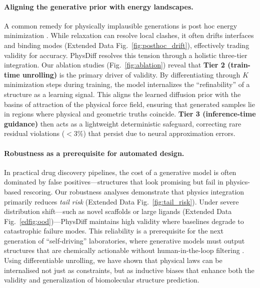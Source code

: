 \documentclass[twocolumn,10pt]{article}
\newcommand{\modelname}{PhysDiff}
\begin{document}
\paragraph{Aligning the generative prior with energy landscapes.}
A common remedy for physically implausible generations is post hoc energy minimization \cite{case2005amber}. While relaxation can resolve local clashes, it often drifts interfaces and binding modes (Extended Data Fig.~\ref{fig:posthoc_drift}), effectively trading validity for accuracy.
\modelname{} resolves this tension through a holistic three-tier integration.
Our ablation studies (Fig.~\ref{fig:ablation}) reveal that \textbf{Tier 2 (train-time unrolling)} is the primary driver of validity.
By differentiating through $K$ minimization steps during training, the model internalizes the ``refinability'' of a structure as a learning signal.
This aligns the learned diffusion prior with the basins of attraction of the physical force field, ensuring that generated samples lie in regions where physical and geometric truths coincide.
\textbf{Tier 3 (inference-time guidance)} then acts as a lightweight deterministic safeguard, correcting rare residual violations ($<3\%$) that persist due to neural approximation errors.

\paragraph{Robustness as a prerequisite for automated design.}
In practical drug discovery pipelines, the cost of a generative model is often dominated by false positives---structures that look promising but fail in physics-based rescoring.
Our robustness analyses demonstrate that physics integration primarily reduces \emph{tail risk} (Extended Data Fig.~\ref{fig:tail_risk}).
Under severe distribution shift---such as novel scaffolds or large ligands (Extended Data Fig.~\ref{edfig:ood})---\modelname{} maintains high validity where baselines degrade to catastrophic failure modes.
This reliability is a prerequisite for the next generation of ``self-driving'' laboratories, where generative models must output structures that are chemically actionable without human-in-the-loop filtering \cite{wang2023scientific,eisenberg2024structure}.
Using differentiable unrolling, we have shown that physical laws can be internalised not just as constraints, but as inductive biases that enhance both the validity and generalization of biomolecular structure prediction.
\end{document}
